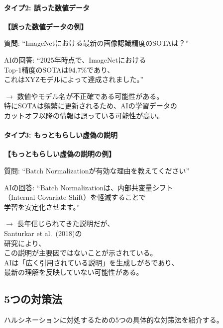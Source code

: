 \paragraph{タイプ2: 誤った数値データ}\mbox{}

\begin{promptbox}
\textbf{【誤った数値データの例】}

質問: ``ImageNetにおける最新の画像認識精度のSOTAは？''

AIの回答: ``2025年時点で、ImageNetにおける\\
Top-1精度のSOTAは94.7\%であり、\\
これはXYZモデルによって達成されました。''

$\rightarrow$ 数値やモデル名が不正確である可能性がある。\\
特にSOTAは頻繁に更新されるため、AIの学習データの\\
カットオフ以降の情報は誤っている可能性が高い。
\end{promptbox}

\paragraph{タイプ3: もっともらしい虚偽の説明}\mbox{}

\begin{promptbox}
\textbf{【もっともらしい虚偽の説明の例】}

質問: ``Batch Normalizationが有効な理由を教えてください''

AIの回答: ``Batch Normalizationは、内部共変量シフト\\
（Internal Covariate Shift）を軽減することで\\
学習を安定化させます。''

$\rightarrow$ 長年信じられてきた説明だが、\\
Santurkar et al.\ (2018)\cite{santurkar2018batch}の\\
研究により、\\
この説明が主要因ではないことが示されている。\\
AIは「広く引用されている説明」を生成しがちであり、\\
最新の理解を反映していない可能性がある。
\end{promptbox}

\subsection{5つの対策法}

ハルシネーションに対処するための5つの具体的な対策法を紹介する。

